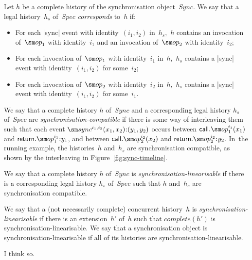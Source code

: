 Let $h$ be a complete history of the synchronisation object~$Sync$.  We say
that a legal history~$h_s$ of~$Spec$ \emph{corresponds} to~$h$ if:
%
\begin{itemize}
\item For each |sync| event with identity~$(i_1,i_2)$ in~$h_s$,\, $h$ contains
  an invocation of~$\op_1$ with identity~$i_1$ and an invocation of~$\op_2$ with
  identity~$i_2$;

\item For each invocation of~$\op_1$ with identity~$i_1$ in~$h$,\, $h_s$
  contains a |sync| event with identity~$(i_1,i_2)$ for some~$i_2$;

\item For each invocation of~$\op_2$ with identity~$i_2$ in~$h$,\, $h_s$
  contains a |sync| event with identity~$(i_1,i_2)$ for some~$i_1$.
\end{itemize}
%

We say that a complete history $h$ of~$Sync$ and a corresponding legal history
$h_s$ of~$Spec$ are \emph{synchronisation-compatible} if there is some way of
interleaving them such that each event $\sync^{i_1, i_2}(x_1, x_2)\:: (y_1,
y_2)$ occurs between $\call.\op_1^{i_1}(x_1)$ and $\return.\op_1^{i_1}\::y_1$,
and between $\call.\op_2^{i_2}(x_2)$ and $\return.\op_2^{i_2}\::y_2$.
%
In~the running example, the histories~$h$ and~$h_s$ are synchronisation
compatible, as shown by the interleaving in Figure~\ref{fig:sync-timeline}.

We say that a complete history $h$ of~$Sync$ is
\emph{synchronisation-linearisable} if there is a corresponding legal history
$h_s$ of~$Spec$ such that $h$ and~$h_s$ are synchronisation compatible.

We say that a (not necessarily complete) concurrent history~$h$ is
\emph{synchronisation-linearisable} if there is an extension~$h'$ of~$h$ such
that $complete(h')$ is synchronisation-linearisable.  We say that a
synchronisation object is synchronisation-linearisable if all of its histories
are synchronisation-linearisable.



  I think so.
